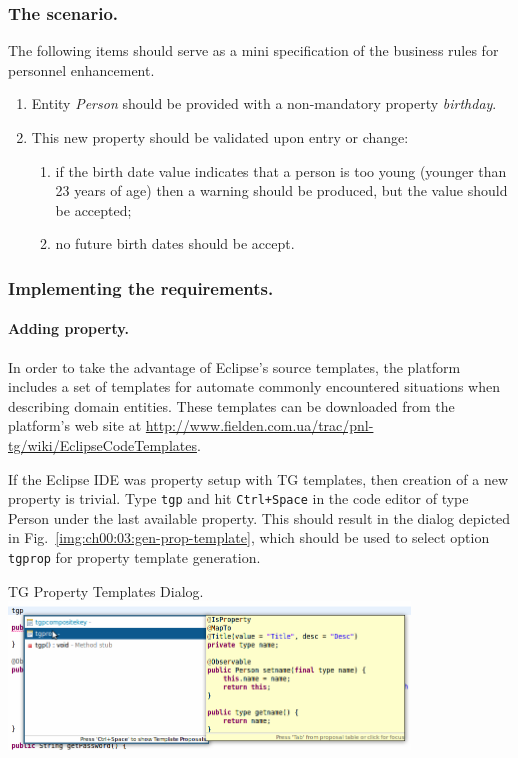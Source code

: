   \subsubsection*{The scenario.}
  The following items should serve as a mini specification of the business rules for personnel enhancement.
  
  \begin{enumerate}
    \item Entity \emph{Person} should be provided with a non-mandatory property \emph{birthday}.
    \item This new property should be validated upon entry or change: 
	\begin{enumerate}
	  \item if the birth date value indicates that a person is too young (younger than 23 years of age) then a warning should be produced, but the value should be accepted;
	  \item no future birth dates should be accept.
	\end{enumerate}
  \end{enumerate}

  \subsubsection*{Implementing the requirements.}

  \paragraph*{Adding property.} 
  In order to take the advantage of Eclipse's source templates, the platform includes a set of templates for automate commonly encountered situations when describing domain entities.
  These templates can be downloaded from the platform's web site at \url{http://www.fielden.com.ua/trac/pnl-tg/wiki/EclipseCodeTemplates}.
  
  If the Eclipse IDE was property setup with TG templates, then creation of a new property is trivial.
  Type \texttt{tgp} and hit \texttt{Ctrl+Space} in the code editor of type Person under the last available property.
  This should result in the dialog depicted in Fig.~\ref{img:ch00:03:gen-prop-template}, which should be used to select option \texttt{tgprop} for property template generation.

  \begin{image}{TG Property Templates Dialog.}{\label{img:ch00:03:gen-prop-template}}
    \includegraphics[width=0.8\textwidth]{parts/00-part/chapters/02-making-changes/images/02-birthday-property-gen.png}
  \end{image}

